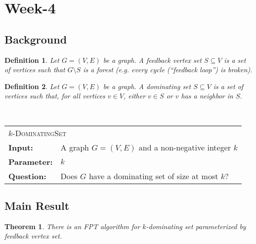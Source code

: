 \documentclass{article}
\newcommand{\problem}[1]{\textsc{#1}}
\newtheorem{theorem}{Theorem}
\newtheorem{definition}{Definition}
\newcommand{\defproblem}[4]{%
  \hfill\\\smallskip\noindent%
  \begin{tabularx}{\textwidth}{|l X|}%
    \hline%
    \multicolumn{2}{|l|}{\problem{#1}}\\%
    \textbf{Input:}&#2\\%
    \textbf{Parameter:}&#3\\%
    \textbf{Question:}&#4\smallskip\\\hline%
  \end{tabularx}%
  \smallskip%
}%
\begin{document}
\newpage
\section*{Week-4}
\subsection*{Background}

\begin{definition}
Let $G = (V, E)$ be a graph. A \emph{feedback vertex set} $S \subseteq V$ is a set of vertices such that $G \setminus S$ is a forest (e.g. every cycle (``feedback loop'') is broken).
\end{definition}

\begin{definition}
Let $G = (V, E)$ be a graph. A \emph{dominating set} $S \subseteq V$ is a set of vertices such that, for all vertices $v \in V$, either $v \in S$ or $v$ has a neighbor in $S$.
\end{definition}

\defproblem{$k$-DominatingSet}
{A graph $G = (V,E)$ and a non-negative integer $k$}
{$k$}
{Does $G$ have a dominating set of size at most $k$?}

\subsection*{Main Result}
\begin{theorem}
There is an FPT algorithm for $k$-dominating set parameterized by feedback vertex set.
\end{theorem}
\end{document}
